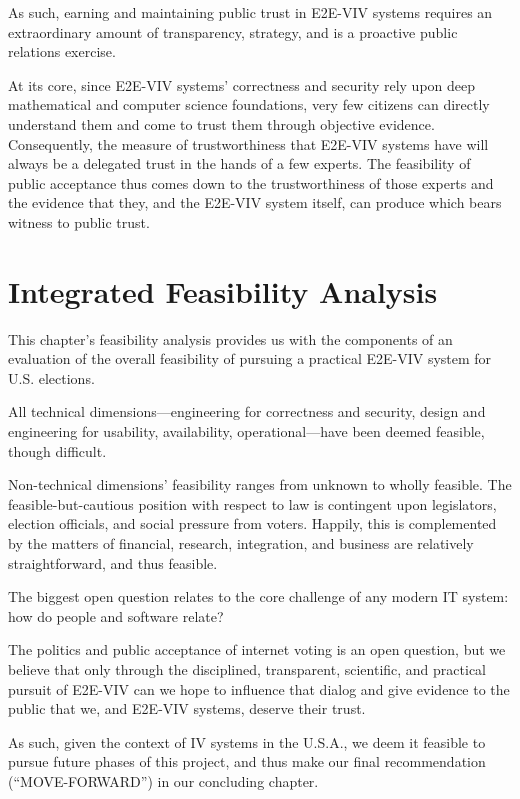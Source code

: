 As such, earning and maintaining public trust in E2E-VIV systems
requires an extraordinary amount of transparency, strategy, and is a
proactive public relations exercise.  

At its core, since E2E-VIV systems' correctness and security rely upon
deep mathematical and computer science foundations, very few citizens
can directly understand them and come to trust them through objective
evidence. Consequently, the measure of trustworthiness that E2E-VIV
systems have will always be a delegated trust in the hands of a few
experts. The feasibility of public acceptance thus comes down to the
trustworthiness of those experts and the evidence that they, and the
E2E-VIV system itself, can produce which bears witness to public
trust.

\section{Integrated Feasibility Analysis}

This chapter's feasibility analysis provides us with the components of
an evaluation of the overall feasibility of pursuing a practical
E2E-VIV system for U.S. elections.

All technical dimensions---engineering for correctness and security,
design and engineering for usability, availability, operational---have
been deemed feasible, though difficult.

Non-technical dimensions' feasibility ranges from unknown to wholly
feasible.  The feasible-but-cautious position with respect to law is
contingent upon legislators, election officials, and social pressure
from voters.  Happily, this is complemented by the matters of
financial, research, integration, and business are relatively
straightforward, and thus feasible.

The biggest open question relates to the core challenge of any modern
IT system: how do people and software relate?

The politics and public acceptance of internet voting is an open
question, but we believe that only through the disciplined,
transparent, scientific, and practical pursuit of E2E-VIV can we hope
to influence that dialog and give evidence to the public that we, and
E2E-VIV systems, deserve their trust.

As such, given the context of IV systems in the U.S.A., we deem it
feasible to pursue future phases of this project, and thus make our
final recommendation (``MOVE-FORWARD'') in our concluding chapter.


